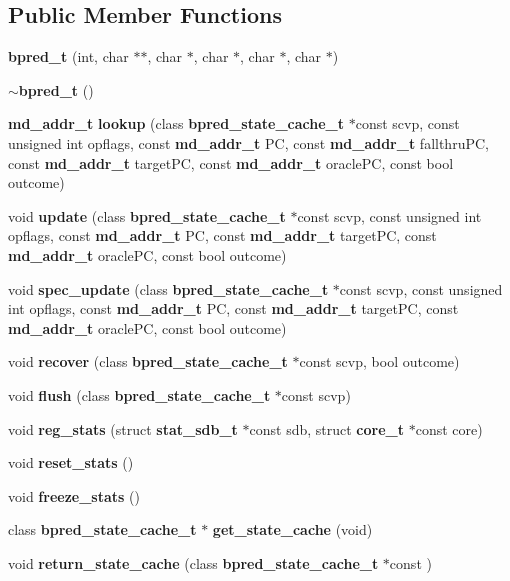 \subsection*{Public Member Functions}
\begin{CompactItemize}
\item 
{\bf bpred\_\-t} (int, char $\ast$$\ast$, char $\ast$, char $\ast$, char $\ast$, char $\ast$)
\item 
{\bf $\sim$bpred\_\-t} ()
\item 
{\bf md\_\-addr\_\-t} {\bf lookup} (class {\bf bpred\_\-state\_\-cache\_\-t} $\ast$const scvp, const unsigned int opflags, const {\bf md\_\-addr\_\-t} PC, const {\bf md\_\-addr\_\-t} fallthruPC, const {\bf md\_\-addr\_\-t} targetPC, const {\bf md\_\-addr\_\-t} oraclePC, const bool outcome)
\item 
void {\bf update} (class {\bf bpred\_\-state\_\-cache\_\-t} $\ast$const scvp, const unsigned int opflags, const {\bf md\_\-addr\_\-t} PC, const {\bf md\_\-addr\_\-t} targetPC, const {\bf md\_\-addr\_\-t} oraclePC, const bool outcome)
\item 
void {\bf spec\_\-update} (class {\bf bpred\_\-state\_\-cache\_\-t} $\ast$const scvp, const unsigned int opflags, const {\bf md\_\-addr\_\-t} PC, const {\bf md\_\-addr\_\-t} targetPC, const {\bf md\_\-addr\_\-t} oraclePC, const bool outcome)
\item 
void {\bf recover} (class {\bf bpred\_\-state\_\-cache\_\-t} $\ast$const scvp, bool outcome)
\item 
void {\bf flush} (class {\bf bpred\_\-state\_\-cache\_\-t} $\ast$const scvp)
\item 
void {\bf reg\_\-stats} (struct {\bf stat\_\-sdb\_\-t} $\ast$const sdb, struct {\bf core\_\-t} $\ast$const core)
\item 
void {\bf reset\_\-stats} ()
\item 
void {\bf freeze\_\-stats} ()
\item 
class {\bf bpred\_\-state\_\-cache\_\-t} $\ast$ {\bf get\_\-state\_\-cache} (void)
\item 
void {\bf return\_\-state\_\-cache} (class {\bf bpred\_\-state\_\-cache\_\-t} $\ast$const )
\end{CompactItemize}
